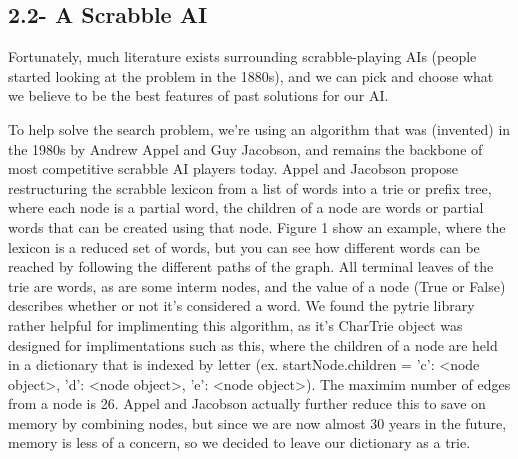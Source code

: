 \documentclass[12pt]{article}
\begin{document}
\subsection*{2.2- A Scrabble AI}

Fortunately, much literature exists surrounding scrabble-playing AIs (people started looking at the problem in the 1880s), and we can pick and choose what we believe to be the best features of past solutions for our AI. 


To help solve the search problem, we're using an algorithm that was (invented) in the 1980s by Andrew Appel and Guy Jacobson, and remains the backbone of most competitive scrabble AI players today. Appel and Jacobson propose restructuring the scrabble lexicon from a list of words into a trie or prefix tree, where each node is a partial word, the children of a node are words or partial words that can be created using that node. Figure 1 show an example, where the lexicon is a reduced set of words, but you can see how different words can be reached by following the different paths of the graph. All terminal leaves of the trie are words, as are some interm nodes, and the value of a node (True or False) describes whether or not it's considered a word. We found the pytrie library rather helpful for implimenting this algorithm, as it's CharTrie object was designed for implimentations such as this, where the children of a node are held in a dictionary that is indexed by letter (ex. startNode.children = {'c': <node object>, 'd': <node object>, 'e': <node object>). The maximim number of edges from a node is 26. Appel and Jacobson actually further reduce this to save on memory by combining nodes, but since we are now almost 30 years in the future, memory is less of a concern, so we decided to leave our dictionary as a trie. 
}
\end{document}
